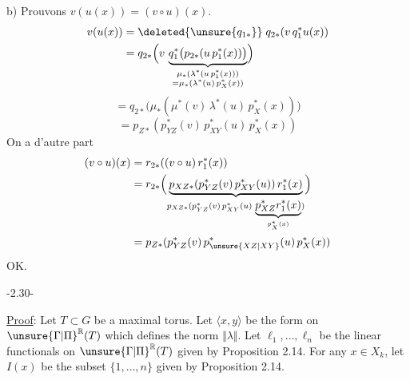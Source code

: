 b) Prouvons $v(u(x))=(v\circ u)(x)$.
\[
\begin{aligned}
v(u(x))&=\deleted{\unsure{q_{1*}}}\;q_{2*}(v\,q_1^*u(x))\\
&=q_{2*}\Bigl(v\,\underbrace{q_1^*\bigl(p_{2*}(u\,p_1^*(x))\bigr)}_{\substack{\mu_*(\lambda^*(u\,p_1^*(x)))\\=\mu_*(\lambda^*(u)\,p_X^*(x))}}\Bigr)
\end{aligned}
\]
\deleted{$\unsure{=}$}\quad\deleted{$\unsure{=}$}
\[
=q_{2*}\bigl(\mu_*(\mu^*(v)\,\lambda^*(u)\,p_X^*(x))\bigr)
\]
\[
=p_{Z*}(p_{YZ}^*(v)\,p_{XY}^*(u)\,p_X^*(x))
\]
On a d'autre part
\[
\begin{aligned}
(v\circ u)(x)&=r_{2*}((v\circ u)\,r_1^*(x))\\
&=r_{2*}\Bigl(\underbrace{p_{XZ*}(p_{YZ}^*(v)\,p_{XY}^*(u))\,r_1^*(x)}_{p_{XZ*}(p_{YZ}^*(v)\,p_{XY}^*(u)\,\underbrace{p_{XZ}^*r_1^*(x)}_{p_X^*(x)})}\Bigr)\\
&=p_{Z*}(p_{YZ}^*(v)\,p_{\unsure{XZ|XY}}^*(u)\,p_X^*(x))
\end{aligned}
\]
OK.
\begin{center}-2.30-\end{center}
\uline{Proof}: Let $T\subset G$ be a maximal torus. Let $\langle x,y\rangle$ be the form
on $\unsure{\Gamma|\Pi}^{\mathbb R}(T)$ which defines the norm $\Vert\lambda\Vert$. Let $\ell_1,\ldots,\ell_n$ be the
linear functionals on $\unsure{\Gamma|\Pi}^{\mathbb R}(T)$ given by Proposition 2.14. For any
$x\in X_k$, let $I(x)$ be the subset $\{1,\ldots,n\}$ given by Proposition 2.14.
